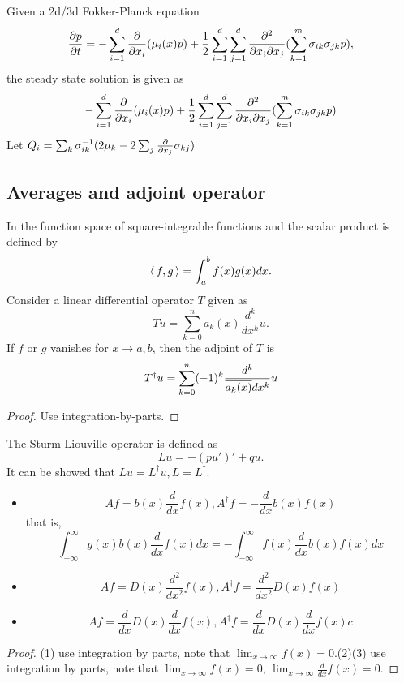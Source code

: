 \begin{refsection}
\begin{lemma}
Given a 2d/3d Fokker-Planck equation
$$\frac{\partial p}{\partial t} = -\sum_{i=1}^d \frac{\partial}{\partial x_i}(\mu_i(x) p)  + \frac{1}{2}\sum_{i=1}^d\sum_{j=1}^d \frac{\partial^2}{\partial x_i\partial x_j}(\sum_{k=1}^m \sigma_{ik}\sigma_{jk}p),$$
the steady state solution is given as
$$-\sum_{i=1}^d \frac{\partial}{\partial x_i}(\mu_i(x) p)  + \frac{1}{2}\sum_{i=1}^d\sum_{j=1}^d \frac{\partial^2}{\partial x_i\partial x_j}(\sum_{k=1}^m \sigma_{ik}\sigma_{jk}p)$$
Let $Q_i = \sum_{k}\sigma^{-1}_{ik}(2\mu_k - 2\sum_j \frac{\partial}{\partial x_j} \sigma_{kj})$
\end{lemma}


\subsection{Averages and adjoint operator}
\begin{lemma}
In the function space of square-integrable functions and the scalar product is defined by 
$${\left< \, f,g \, \right>} = \int_a^b f(x)\bar{g(x)}dx.$$
Consider a linear differential operator $T$ given as
$$Tu = \sum_{k=0}^n a_k(x)\frac{d^k}{dx^k} u.$$
If $f$ or $g$ vanishes for $x\to a, b$, then the adjoint of $T$ is
$$T^\dagger u = \sum_{k=0}^n (-1)^k \frac{d^k}{\overline{a_k(x)}dx^k} u$$
\end{lemma}
\begin{proof}
Use integration-by-parts.
\end{proof}



\begin{example}
The Sturm-Liouville operator is defined as
$$Lu = -(pu')' + qu.$$
It can be showed that $Lu = L^\dagger u, L = L^\dagger.$
\end{example}

\begin{corollary}\hfill
	\begin{itemize}
		\item $$Af = b(x)\frac{d}{dx}f(x), A^{\dagger}f=-\frac{d}{dx}b(x)f(x)$$
		that is,$$\int_{-\infty}^{\infty} g(x)b(x)\frac{d}{dx}f(x) dx = -\int_{-\infty}^{\infty} f(x)\frac{d}{dx}b(x)f(x) dx$$
		\item $$Af = D(x)\frac{d^2}{dx^2}f(x), A^{\dagger}f=\frac{d^2}{dx^2}D(x)f(x)$$
		\item $$Af = \frac{d}{dx}D(x)\frac{d}{dx}f(x), A^{\dagger}f=\frac{d}{dx}D(x)\frac{d}{dx}f(x)c$$
	\end{itemize}
\end{corollary}
\begin{proof}
	(1) use integration by parts, note that $\lim_{x\to\infty} f(x) = 0$.(2)(3) use integration by parts, note that $\lim_{x\to\infty} f(x) = 0$, $\lim_{x\to\infty} \frac{d}{dx}f(x) = 0$.
\end{proof}


\end{refsection}
